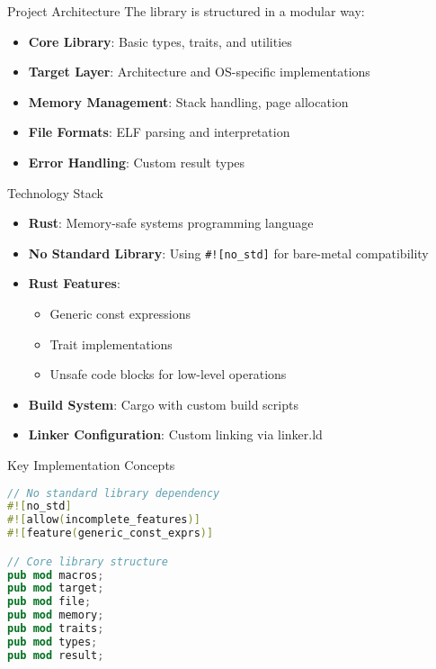 \documentclass{beamer}
\begin{document}
\begin{frame}{Project Architecture}
  The library is structured in a modular way:
  \begin{itemize}
    \item \textbf{Core Library}: Basic types, traits, and utilities
    \item \textbf{Target Layer}: Architecture and OS-specific implementations
    \item \textbf{Memory Management}: Stack handling, page allocation
    \item \textbf{File Formats}: ELF parsing and interpretation
    \item \textbf{Error Handling}: Custom result types
  \end{itemize}
\end{frame}

\begin{frame}{Technology Stack}
  \begin{itemize}
    \item \textbf{Rust}: Memory-safe systems programming language
    \item \textbf{No Standard Library}: Using \texttt{\#![no\_std]} for bare-metal compatibility
    \item \textbf{Rust Features}:
      \begin{itemize}
        \item Generic const expressions
        \item Trait implementations
        \item Unsafe code blocks for low-level operations
      \end{itemize}
    \item \textbf{Build System}: Cargo with custom build scripts
    \item \textbf{Linker Configuration}: Custom linking via linker.ld
  \end{itemize}
\end{frame}

\begin{frame}[fragile]{Key Implementation Concepts}
  \begin{lstlisting}[language=Rust]
// No standard library dependency
#![no_std]
#![allow(incomplete_features)]
#![feature(generic_const_exprs)]

// Core library structure
pub mod macros;
pub mod target;
pub mod file;
pub mod memory;
pub mod traits;
pub mod types;
pub mod result;
  \end{lstlisting}
\end{frame}
\end{document}
